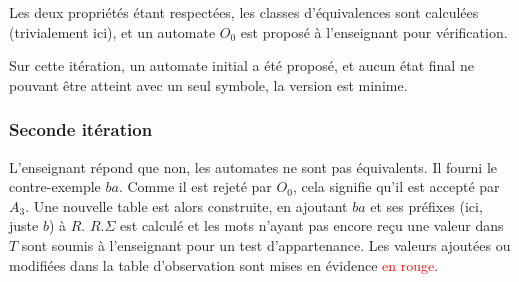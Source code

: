 Les deux propriétés étant respectées, les classes d'équivalences sont calculées (trivialement ici), et un automate $O_0$ est proposé à l'enseignant pour vérification.

Sur cette itération, un automate initial a été proposé, et aucun état final ne pouvant être atteint avec un seul symbole, la version est minime.

\subsubsection{Seconde itération}

L'enseignant répond que non, les automates ne sont pas équivalents. Il fourni le contre-exemple $ba$. Comme il est rejeté par $O_0$, cela signifie qu'il est accepté par $A_3$. Une nouvelle table est alors construite, en ajoutant $ba$ et ses préfixes (ici, juste $b$) à $R$. $R.\Sigma$ est calculé et les mots n'ayant pas encore reçu une valeur dans $T$ sont soumis à l'enseignant pour un test d'appartenance.
Les valeurs ajoutées ou modifiées dans la table d'observation sont mises en évidence \textcolor{red}{en rouge}.
\vspace{1cm}

